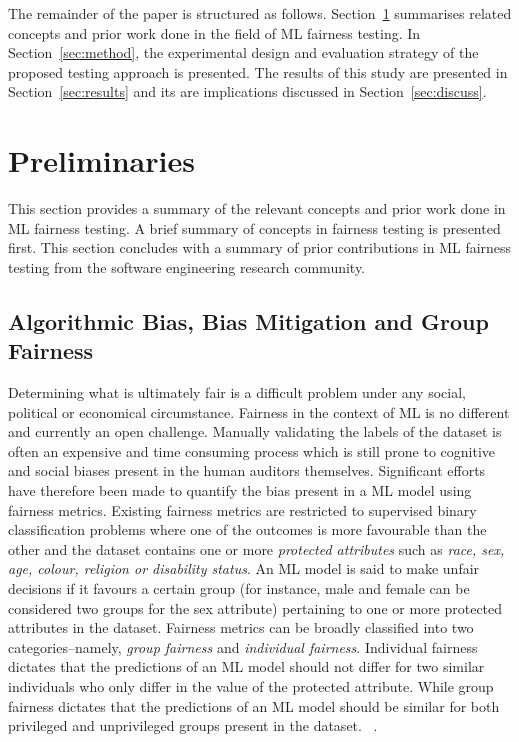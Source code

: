 \documentclass{article}
\begin{document}
The remainder of the paper is structured as follows.
Section \ref{sec:related} summarises related concepts and prior work
done in the field of ML fairness testing. In Section \ref{sec:method},
the experimental design and evaluation strategy of the proposed
testing approach is presented. The results of this study are presented
in Section \ref{sec:results} and its are implications discussed in
Section \ref{sec:discuss}.

\section{Preliminaries}\label{sec:related}
This section provides a summary of the relevant concepts and prior
work done in ML fairness testing. A brief summary of concepts in
fairness testing is presented first. This section concludes with a
summary of prior contributions in ML fairness testing from the
software engineering research community.

\subsection{Algorithmic Bias, Bias Mitigation and Group Fairness}\label{sec:bias-fairness}

Determining what is ultimately fair is a difficult problem under any
social, political or economical circumstance. Fairness in the context
of ML is no different and currently an open challenge. Manually
validating the labels of the dataset is often an expensive and time
consuming process which is still prone to cognitive and social biases
present in the human auditors themselves. Significant efforts have
therefore been made to quantify the bias present in a ML model using
fairness metrics. Existing fairness metrics are restricted to
supervised binary classification problems where one of the outcomes is
more favourable than the other and the dataset contains one or more
\emph{protected attributes} such as \emph{race, sex, age, colour,
religion or disability status}. An ML model is said to make unfair
decisions if it favours a certain group (for instance, male and female
can be considered two groups for the sex attribute) pertaining to one
or more protected attributes in the dataset. Fairness metrics can be
broadly classified into two categories--namely, \emph{group fairness}
and \emph{individual fairness}. Individual fairness dictates that the
predictions of an ML model should not differ for two similar
individuals who only differ in the value of the protected
attribute. While group fairness dictates that the predictions of an ML
model should be similar for both privileged and unprivileged groups
present in the
dataset.  \cite{castelnovo2022clarification,hellman2020measuring,mitchell2021algorithmic,kusner2017counterfactual,grgic2016case,dwork2012fairness,barocas2019fairness,barocas2016big,hardt2016equality,binns2018fairness,hutchinson201950,verma2018fairness,saxena2019fairness}.
\end{document}
